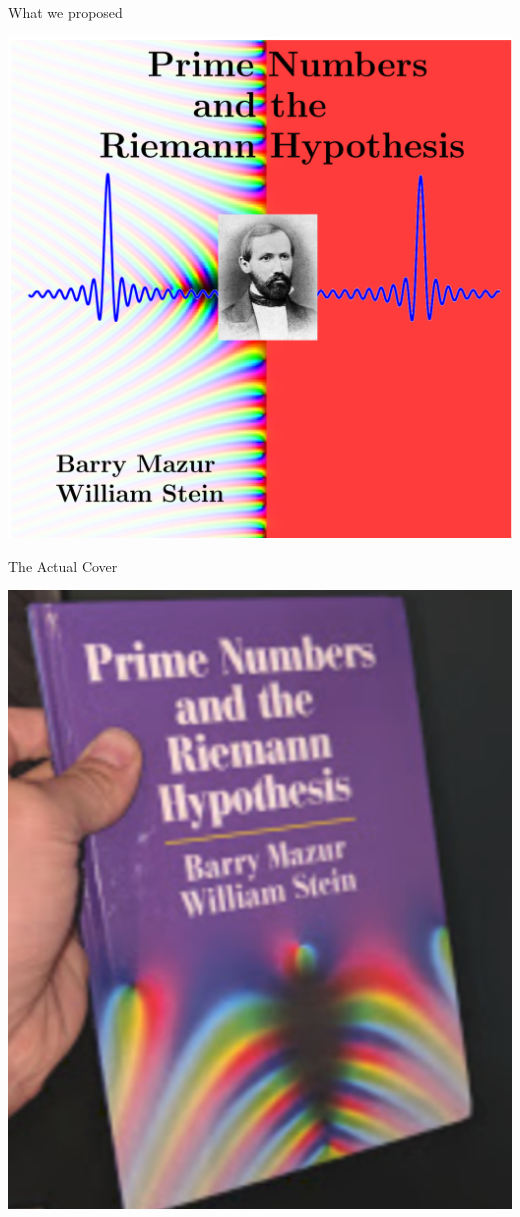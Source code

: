 \documentclass{beamer}
\begin{document}
\begin{frame}{What we proposed}
  \begin{center}
    \includegraphics[height=.82\textheight]{pics/cover-we-wanted}
  \end{center}
\end{frame}

\begin{frame}{The Actual Cover}
  \begin{center}
    \includegraphics[height=.82\textheight]{pics/cover-front}
  \end{center}
\end{frame}
\end{document}
